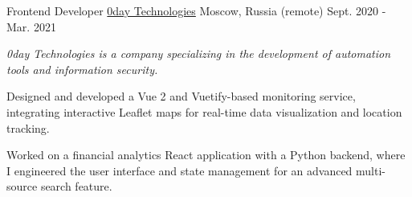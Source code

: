 \begin{cventries}
 \cventry
    {Frontend Developer} %
    {\href{https://0day.llc/}{0day Technologies}}
    {Moscow, Russia (remote)} %
    {Sept. 2020 - Mar. 2021} %
    {
      \begin{cvitems} %
      \vspace{8pt}
      \item[] {\small\textit{0day Technologies is a company specializing in the development of automation tools and information security.}}
      \vspace{8pt}
        \item {Designed and developed a Vue 2 and Vuetify-based monitoring service, integrating interactive Leaflet maps for real-time data visualization and location tracking.}
        \item {Worked on a financial analytics React application with a Python backend, where I engineered the user interface and state management for an advanced multi-source search feature.}
      \end{cvitems}
    }
    {\vspace{24pt}}

\end{cventries}
